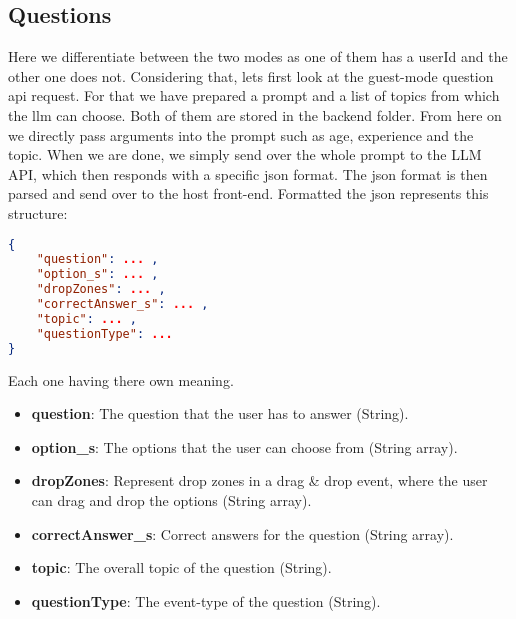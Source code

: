\subsection{Questions}
Here we differentiate between the two modes as one of them has a userId and the other one does not.
Considering that, lets first look at the guest-mode question api request.
For that we have prepared a prompt and a list of topics from which the llm can choose.
Both of them are stored in the backend folder.
From here on we directly pass arguments into the prompt such as age, experience and the topic.
When we are done, we simply send over the whole prompt to the LLM API, which then responds with a specific json format.
The json format is then parsed and send over to the host front-end.
Formatted the json represents this structure:
\begin{lstlisting}[language=json,firstnumber=1]
{
    "question": ... ,
    "option_s": ... ,
    "dropZones": ... ,
    "correctAnswer_s": ... ,
    "topic": ... ,
    "questionType": ...
}
\end{lstlisting}
Each one having there own meaning.
\begin{itemize}
    \item \textbf{question}: The question that the user has to answer (String).
    \item \textbf{option\_s}: The options that the user can choose from (String array).
    \item \textbf{dropZones}: Represent drop zones in a drag \& drop event, where the user can drag and drop the options (String array).
    \item \textbf{correctAnswer\_s}: Correct answers for the question (String array).
    \item \textbf{topic}: The overall topic of the question (String).
    \item \textbf{questionType}: The event-type of the question (String).
\end{itemize}

